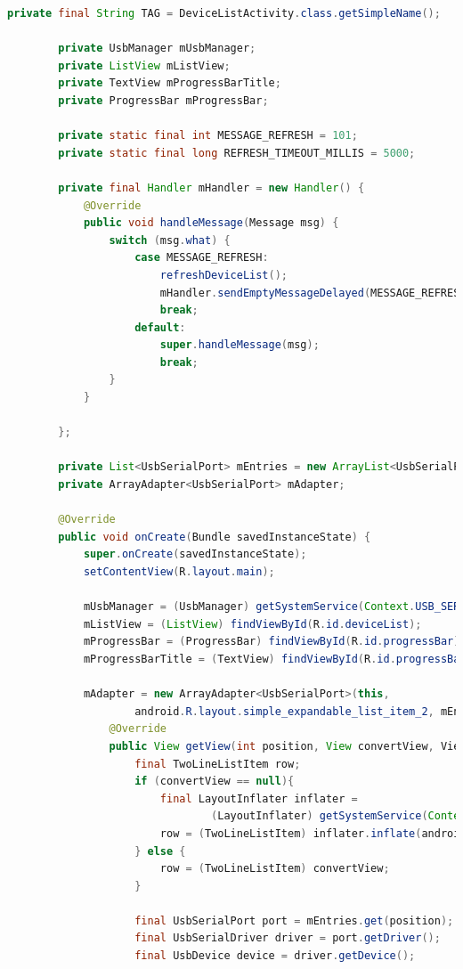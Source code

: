 \documentclass{article}
\numberwithin{figure}{section}
\numberwithin{equation}{section}
\begin{document}
{\begin{lstlisting}[language=Java,label=lst:devicelist,caption=DeviceListActivity.java]
        private final String TAG = DeviceListActivity.class.getSimpleName();

        private UsbManager mUsbManager;
        private ListView mListView;
        private TextView mProgressBarTitle;
        private ProgressBar mProgressBar;

        private static final int MESSAGE_REFRESH = 101;
        private static final long REFRESH_TIMEOUT_MILLIS = 5000;

        private final Handler mHandler = new Handler() {
            @Override
            public void handleMessage(Message msg) {
                switch (msg.what) {
                    case MESSAGE_REFRESH:
                        refreshDeviceList();
                        mHandler.sendEmptyMessageDelayed(MESSAGE_REFRESH, REFRESH_TIMEOUT_MILLIS);
                        break;
                    default:
                        super.handleMessage(msg);
                        break;
                }
            }

        };

        private List<UsbSerialPort> mEntries = new ArrayList<UsbSerialPort>();
        private ArrayAdapter<UsbSerialPort> mAdapter;

        @Override
        public void onCreate(Bundle savedInstanceState) {
            super.onCreate(savedInstanceState);
            setContentView(R.layout.main);

            mUsbManager = (UsbManager) getSystemService(Context.USB_SERVICE);
            mListView = (ListView) findViewById(R.id.deviceList);
            mProgressBar = (ProgressBar) findViewById(R.id.progressBar);
            mProgressBarTitle = (TextView) findViewById(R.id.progressBarTitle);

            mAdapter = new ArrayAdapter<UsbSerialPort>(this,
                    android.R.layout.simple_expandable_list_item_2, mEntries) {
                @Override
                public View getView(int position, View convertView, ViewGroup parent) {
                    final TwoLineListItem row;
                    if (convertView == null){
                        final LayoutInflater inflater =
                                (LayoutInflater) getSystemService(Context.LAYOUT_INFLATER_SERVICE);
                        row = (TwoLineListItem) inflater.inflate(android.R.layout.simple_list_item_2, null);
                    } else {
                        row = (TwoLineListItem) convertView;
                    }

                    final UsbSerialPort port = mEntries.get(position);
                    final UsbSerialDriver driver = port.getDriver();
                    final UsbDevice device = driver.getDevice();


\end{lstlisting}}
\end{document}
